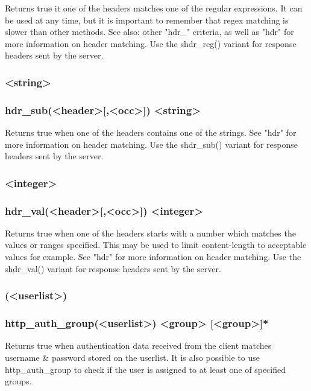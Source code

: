   Returns true it one of the headers matches one of the regular expressions. It
  can be used at any time, but it is important to remember that regex matching
  is slower than other methods. See also: other "hdr\_" criteria, as well as
  "hdr" for more information on header matching. Use the shdr\_reg() variant for
  response headers sent by the server.

\subsubsection[hdr\_sub]{ <string>}
\subsubsection*{hdr\_sub(<header>[,<occ>]) <string>}

  Returns true when one of the headers contains one of the strings. See "hdr"
  for more information on header matching. Use the shdr\_sub() variant for
  response headers sent by the server.

\subsubsection[hdr\_val]{ <integer>}
\subsubsection*{hdr\_val(<header>[,<occ>]) <integer>}

  Returns true when one of the headers starts with a number which matches the
  values or ranges specified. This may be used to limit content-length to
  acceptable values for example. See "hdr" for more information on header
  matching. Use the shdr\_val() variant for response headers sent by the server.

\subsubsection[http\_auth]{(<userlist>)}
\subsubsection[http\_auth\_group]{http\_auth\_group(<userlist>) <group> [<group>]*}

  Returns true when authentication data received from the client matches
  username \& password stored on the userlist. It is also possible to
  use http\_auth\_group to check if the user is assigned to at least one
  of specified groups.

